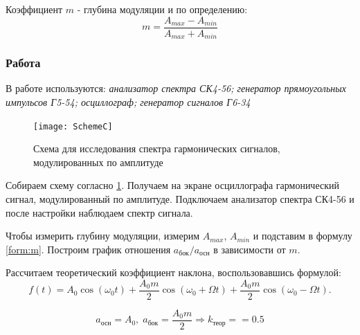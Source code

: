 \documentclass[a4paper, 12pt]{article}
\begin{document}
Коэффициент $m$ - глубина модуляции и по определению:
\begin{equation}
\label{form:m}
	m = \frac{A_{max}-A_{min}}{A_{max}+A_{min}}
\end{equation}

\subsubsection*{Работа}
В работе используются: \textit{анализатор спектра СК4-56; генератор прямоугольных импульсов Г5-54; осциллограф; генератор сигналов Г6-34}

\begin{figure}[H]
\centering
\texttt{[image: SchemeC]}
\caption{Схема для исследования спектра гармонических сигналов, модулированных по амплитуде}
\label{img:scheme C}
\end{figure}

Собираем схему согласно \ref{img:scheme C}. Получаем на экране осциллографа гармонический сигнал, модулированный по амплитуде. Подключаем анализатор спектра СК4-56 и после настройки наблюдаем спектр сигнала.

Чтобы измерить глубину модуляции, измерим $A_{max}$, $A_{min}$ и подставим в формулу \ref{form:m}. Построим график отношения $a_\text{бок}/a_\text{осн}$ в зависимости от $m$.

Рассчитаем теоретический коэффициент наклона, воспользовавшись формулой:
\begin{equation}
\label{form:a/a(m)}
	f(t)=A_0\cos(\omega_0t)+	\frac{A_0m}{2}\cos(\omega_0+\Omega t)+\frac{A_0m}{2}\cos(\omega_0-\Omega t). 
\end{equation}

$$a_\text{осн} = A_0, \; a_\text{бок}= \frac{A_0m}{2} \Rightarrow k_\text{теор} = =0.5$$
	
\end{document}
